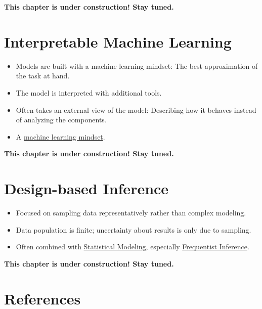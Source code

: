 \documentclass[
  10pt,
]{scrbook}
\providecommand{\tightlist}{%
  \setlength{\itemsep}{0pt}\setlength{\parskip}{0pt}}
\begin{document}
\textbf{This chapter is under construction! Stay tuned.}

\hypertarget{interpretable-ml}{%
\chapter{Interpretable Machine Learning}\label{interpretable-ml}}

\begin{itemize}
\tightlist
\item
  Models are built with a machine learning mindset: The best approximation of the task at hand.
\item
  The model is interpreted with additional tools.
\item
  Often takes an external view of the model: Describing how it behaves instead of analyzing the components.
\item
  A \protect\hyperlink{machine-learning}{machine learning mindset}.
\end{itemize}

\textbf{This chapter is under construction! Stay tuned.}

\hypertarget{design-based-inference}{%
\chapter{Design-based Inference}\label{design-based-inference}}

\begin{itemize}
\tightlist
\item
  Focused on sampling data representatively rather than complex modeling.
\item
  Data population is finite; uncertainty about results is only due to sampling.
\item
  Often combined with \protect\hyperlink{statistical-modeling}{Statistical Modeling}, especially \protect\hyperlink{frequentist-inference}{Frequentist Inference}.
\end{itemize}

\textbf{This chapter is under construction! Stay tuned.}

\hypertarget{references}{%
\chapter*{References}\label{references}}
\end{document}
